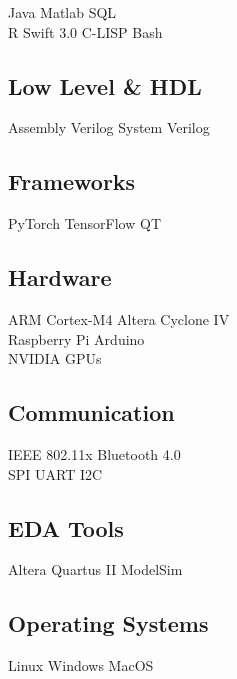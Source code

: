 \documentclass[letterpaper]{deedy-resume} %
\begin{document}
\begin{minipage}[t]{0.33\textwidth}
Java \textbullet{} Matlab \textbullet{} SQL \\

R \textbullet{} Swift 3.0 \textbullet{} C-LISP \textbullet{} Bash\\ 
\sectionspace %

\subsection{Low Level \& HDL}
Assembly \textbullet{} Verilog \textbullet{} System Verilog

\sectionspace

\subsection{Frameworks}
PyTorch \textbullet{} TensorFlow \textbullet{} QT

\sectionspace %

\subsection{Hardware}
ARM Cortex-M4 \textbullet{} Altera Cyclone IV \\
Raspberry Pi \textbullet{} Arduino \\ 
NVIDIA GPUs 

\sectionspace

\subsection{Communication}
IEEE 802.11x \textbullet{} Bluetooth 4.0 \\
SPI \textbullet{} UART \textbullet{} I2C 

\sectionspace %

\subsection{EDA Tools}
Altera Quartus II \textbullet{} ModelSim

\sectionspace %

\subsection{Operating Systems}
Linux \textbullet{} Windows \textbullet{} MacOS


\end{minipage}
\end{document}
